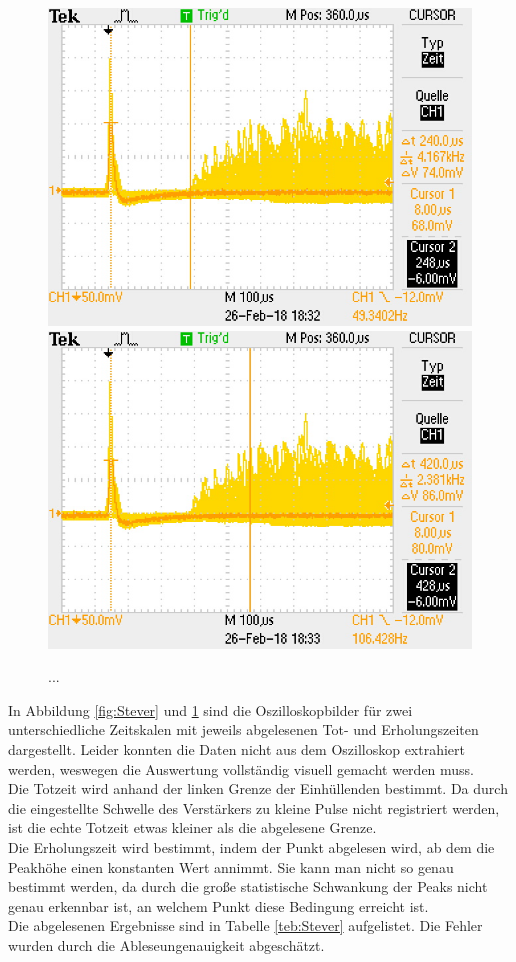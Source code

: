 \documentclass[12pt,a4paper]{article}
\begin{document}
\begin{figure}
\centering
\includegraphics[scale=0.49]{Bilder/Stever/Stever2_1.PNG}
\includegraphics[scale=0.49]{Bilder/Stever/Stever2_2.PNG}
\caption{...}
\label{fig:Stever2}
\end{figure}


In Abbildung \ref{fig:Stever} und \ref{fig:Stever2} sind die Oszilloskopbilder für zwei unterschiedliche Zeitskalen mit jeweils abgelesenen Tot- und Erholungszeiten dargestellt. Leider konnten die Daten nicht aus dem Oszilloskop extrahiert werden, weswegen die Auswertung vollständig visuell gemacht werden muss.\\
Die Totzeit wird anhand der linken Grenze der Einhüllenden bestimmt. Da durch die eingestellte Schwelle des Verstärkers zu kleine Pulse nicht registriert werden, ist die echte Totzeit etwas kleiner als die abgelesene Grenze.\\
Die Erholungszeit wird bestimmt, indem der Punkt abgelesen wird, ab dem die Peakhöhe einen konstanten Wert annimmt.
Sie kann man nicht so genau bestimmt werden, da durch die große statistische Schwankung der Peaks nicht genau erkennbar ist, an welchem Punkt diese Bedingung erreicht ist.\\
Die abgelesenen Ergebnisse sind in Tabelle \ref{teb:Stever} aufgelistet. Die Fehler wurden durch die Ableseungenauigkeit abgeschätzt.
\end{document}
